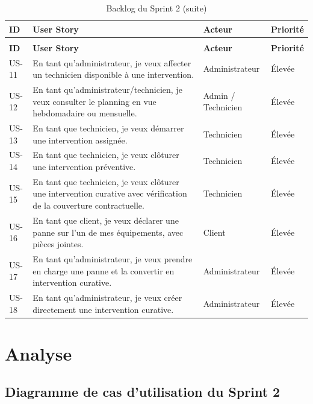 \begin{longtable}{|p{1.2cm}|p{7.5cm}|p{2.8cm}|p{1.8cm}|}
\caption{Backlog du Sprint 2 --- US-11 à US-20}
\label{tab:ch4:backlog_sprint2} \\
\hline
\textbf{ID} & \textbf{User Story} & \textbf{Acteur} & \textbf{Priorité} \\
\hline
\endfirsthead
\caption*{Backlog du Sprint 2 (suite)} \\
\hline
\textbf{ID} & \textbf{User Story} & \textbf{Acteur} & \textbf{Priorité} \\
\hline
\endhead
\hline
\endfoot
\hline
\endlastfoot
US-11 & En tant qu'administrateur, je veux affecter un technicien disponible à une intervention. & Administrateur & Élevée \\
\hline
US-12 & En tant qu'administrateur/technicien, je veux consulter le planning en vue hebdomadaire ou mensuelle. & Admin / Technicien & Élevée \\
\hline
US-13 & En tant que technicien, je veux démarrer une intervention assignée. & Technicien & Élevée \\
\hline
US-14 & En tant que technicien, je veux clôturer une intervention préventive. & Technicien & Élevée \\
\hline
US-15 & En tant que technicien, je veux clôturer une intervention curative avec vérification de la couverture contractuelle. & Technicien & Élevée \\
\hline
US-16 & En tant que client, je veux déclarer une panne sur l'un de mes équipements, avec pièces jointes. & Client & Élevée \\
\hline
US-17 & En tant qu'administrateur, je veux prendre en charge une panne et la convertir en intervention curative. & Administrateur & Élevée \\
\hline
US-18 & En tant qu'administrateur, je veux créer directement une intervention curative. & Administrateur & Élevée \\
\hline
\end{longtable}

\section{Analyse}

\subsection{Diagramme de cas d'utilisation du Sprint 2}

